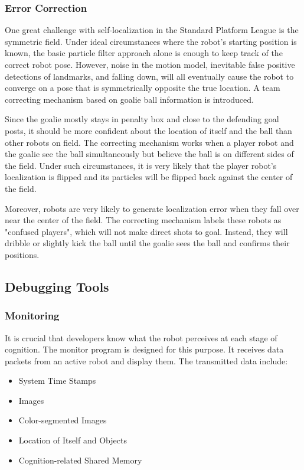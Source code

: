 \documentclass{article}
\begin{document}
\subsubsection{Error Correction}
	One great challenge with self-localization in the Standard Platform League is the symmetric field. Under ideal circumstances where the robot's starting position is known, the basic particle filter approach alone is enough to keep track of the correct robot pose. However, noise in the motion model, inevitable false positive detections of landmarks, and falling down, will all eventually cause the robot to converge on a pose that is symmetrically opposite the true location. A team correcting mechanism based on goalie ball information is introduced.

	Since the goalie mostly stays in penalty box and close to the defending goal posts, it should be more confident about the location of itself and the ball than other robots on field. The correcting mechanism works when a player robot and the goalie see the ball simultaneously but believe the ball is on different sides of the field. Under such circumstances, it is very likely that the player robot's localization is flipped and its particles will be flipped back against the center of the field.

	Moreover, robots are very likely to generate localization error when they fall over near the center of the field. The correcting mechanism labels these robots as "confused players", which will not make direct shots to goal. Instead, they will dribble or slightly kick the ball until the goalie sees the ball and confirms their positions.

\subsection{Debugging Tools}
\subsubsection{Monitoring}    
	It is crucial that developers know what the robot perceives at each stage of cognition. The monitor program is designed for this purpose. It receives data packets from an active robot and display them. The transmitted data include:
	
	\begin{itemize}
		\item{System Time Stamps}
		\item{Images}
		\item{Color-segmented Images}
		\item{Location of Itself and Objects}
		\item{Cognition-related Shared Memory}
	\end{itemize}
\end{document}
